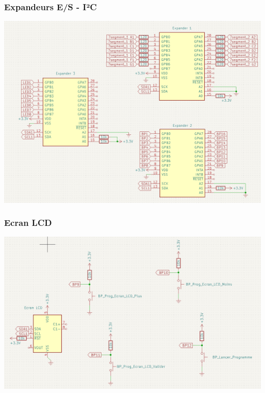 \documentclass[12pt]{report}
\begin{document}
	\subsubsection{Expandeurs E/S - I²C}
	\includegraphics[width=\textwidth]{img/st_exp}
	\subsubsection{Ecran LCD}
	\includegraphics[width=\textwidth]{img/st_LCD}
\end{document}
